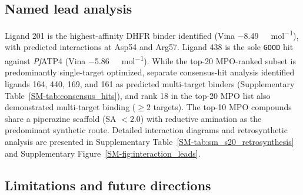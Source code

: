 \documentclass[journal=jcisd8,manuscript=article]{achemso}
\begin{document}
\subsection*{Named lead analysis}
\label{sec:discussion-leads}

Ligand 201 is the highest-affinity DHFR binder identified (Vina \qty{-8.49}{\kilo\calorie\per\mole}), with predicted interactions at Asp54 and Arg57. Ligand 438 is the sole \texttt{GOOD} hit against \emph{Pf}ATP4 (Vina \qty{-5.86}{\kilo\calorie\per\mole}). While the top-20 MPO-ranked subset is predominantly single-target optimized, separate consensus-hit analysis identified ligands 164, 440, 169, and 161 as predicted multi-target binders (Supplementary Table~\ref{SM-tab:consensus_hits}), and rank 18 in the top-20 MPO list also demonstrated multi-target binding ($\geq 2$ targets). The top-10 MPO compounds share a piperazine scaffold (SA $< \num{2.0}$) with reductive amination as the predominant synthetic route. Detailed interaction diagrams and retrosynthetic analysis are presented in Supplementary Table~\ref{SM-tab:sm_s20_retrosynthesis} and Supplementary Figure~\ref{SM-fig:interaction_leads}.

\subsection*{Limitations and future directions}
\end{document}
